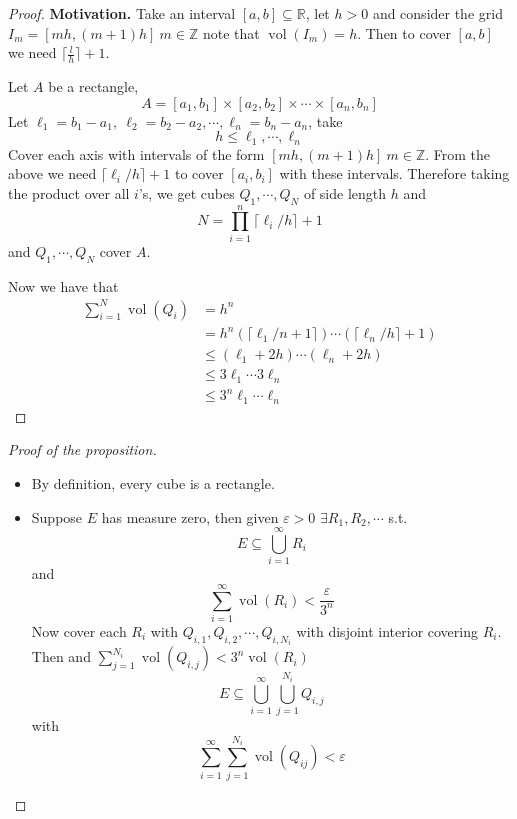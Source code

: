 \documentclass[11pt,openany]{book}
\theoremstyle{plain}
\theoremstyle{definition}
\theoremstyle{remark}
\newcommand{\R}{\mathbb{R}}
\newcommand{\Z}{\mathbb{Z}}
\newcommand{\vol}{\operatorname{vol}}
\begin{document}
\begin{proof}
    \textbf{Motivation.} Take an interval $[a,b] \subseteq \R$, let $h > 0$ and consider the grid $I_m = [mh, (m+1)h] \ m \in \Z$ note that 
    $\vol (I_m) = h$. Then to cover $[a,b]$ we  need $\lceil \frac{l}{h} \rceil + 1$. 

    Let $A$ be a rectangle, 
    $$A = [a_1, b_1] \times [a_2, b_2] \times \cdots \times [a_n, b_n]$$
    Let $\ell_1 = b_1 - a_1 ,\ \ell_2 = b_2-a_2, \cdots, \ell_n = b_n - a_n$, take 
    $$h \le \ell_1, \cdots, \ell_n$$
    Cover each axis with intervals of the form $[mh, (m+1)h]\ m \in \Z$. From the above we need $\lceil \ell_i/h\rceil + 1$ 
    to cover $[a_i, b_i]$ with these intervals. Therefore taking the product over all $i$'s, we get cubes $Q_1, \cdots, Q_N$ of 
    side length $h$ and 
    $$N = \prod_{i=1}^n \lceil \ell_i/h\rceil + 1$$
    and $Q_1, \cdots, Q_N$ cover $A$.

    Now we have that 
    \begin{align*}
        \sum_{i=1}^N \vol (Q_i) &= h^n \\
        &= h^n \left(\lceil \ell_1/n + 1\rceil\right) \cdots \left(\lceil \ell_n/h\rceil + 1\right) \\
        &\le (\ell_1 + 2h) \cdots (\ell_n + 2h) \\
        &\le 3 \ell_1 \cdots 3 \ell_n \\
        &\le 3^n \ell_1 \cdots \ell_n
    \end{align*}
\end{proof}

\begin{proof}[Proof of the proposition]
    \begin{itemize}
        \item[$\impliedby$] By definition, every cube is a rectangle. 
        
        \item[$\implies$] Suppose $E$ has measure zero, then given $\varepsilon > 0$ $\exists R_1, R_2, \cdots$ s.t. 
        $$E \subseteq \bigcup_{i=1}^\infty R_i$$ 
        and 
        $$\sum_{i=1}^\infty \vol (R_i) < \frac{\varepsilon}{3^n}$$
        Now cover each $R_i$ with $Q_{i,1}, Q_{i,2}, \cdots, Q_{i,N_i}$ with disjoint interior covering $R_i$. Then 
        and $\sum_{j=1}^{N_i} \vol (Q_{i,j}) < 3^n \vol (R_i)$
        $$E \subseteq \bigcup_{i=1}^\infty \bigcup_{j=1}^{N_i}  Q_{i,j}$$
        with 
        $$\sum_{i=1}^\infty \sum_{j=1}^{N_i} \vol (Q_{ij}) < \varepsilon$$
    \end{itemize}
\end{proof}
\end{document}
